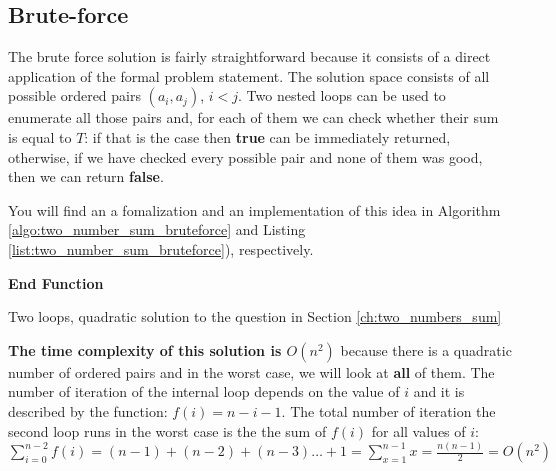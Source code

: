 \subsection{Brute-force}
\label{sec:two_numbers:bruteforce}

The brute force solution is fairly straightforward because it consists of a direct application of the formal problem statement. 
The solution space consists of all possible ordered pairs $(a_i,a_j)$, $i < j$. 
Two nested loops can be used to enumerate all those pairs and, for each of them we can check whether their sum is equal to $T$: if that is the case
then   \textbf{true} can be immediately returned, otherwise, if we have checked every possible pair and none of them was good, then we can return \textbf{false}.

You will find an a fomalization and an implementation of this idea in Algorithm \ref{algo:two_number_sum_bruteforce}
and Listing \ref{list:two_number_sum_bruteforce}), respectively.

\begin{algorithm}
	\SetAlgoLined {}
	
	 

	\textbf{End Function}
	
		\caption{Two loops, quadratic solution to the question in Section \ref{ch:two_numbers_sum} }
		\label{algo:two_number_sum_bruteforce}
\end{algorithm}




\textbf{The time complexity of this solution is $O(n^2)$} because there is a quadratic number of ordered pairs and in the worst case, we will look at \textbf{all} of them.
The number of iteration of the internal loop depends on the value of $i$ and
it is described by the function: $f(i) = n-i-1$. The total number of iteration the second
loop runs in the worst case is the the sum of $f(i)$ for all values of $i$: 
$\sum_{i=0}^{n-2} f(i) = (n-1) + (n-2) + (n-3) \ldots + 1 =\sum_{x=1}^{n-1} x= \frac{n(n-1)}{2} = O(n^2)$

